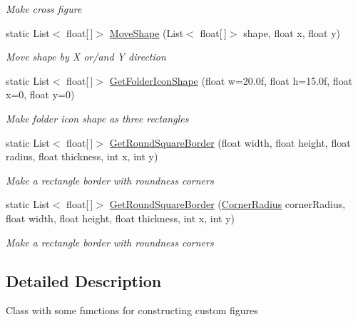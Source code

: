 \begin{DoxyCompactItemize}
\begin{DoxyCompactList}\small\item\em Make cross figure \end{DoxyCompactList}\item 
static List$<$ float\mbox{[}$\,$\mbox{]}$>$ \mbox{\hyperlink{class_space_v_i_l_1_1_graphics_math_service_a3eca6ab5259a561b3f73d8efe30c911e}{Move\+Shape}} (List$<$ float\mbox{[}$\,$\mbox{]}$>$ shape, float x, float y)
\begin{DoxyCompactList}\small\item\em Move shape by X or/and Y direction \end{DoxyCompactList}\item 
static List$<$ float\mbox{[}$\,$\mbox{]}$>$ \mbox{\hyperlink{class_space_v_i_l_1_1_graphics_math_service_a51f68778aa487f8ccad18df097255a4a}{Get\+Folder\+Icon\+Shape}} (float w=20.\+0f, float h=15.\+0f, float x=0, float y=0)
\begin{DoxyCompactList}\small\item\em Make folder icon shape as three rectangles \end{DoxyCompactList}\item 
static List$<$ float\mbox{[}$\,$\mbox{]}$>$ \mbox{\hyperlink{class_space_v_i_l_1_1_graphics_math_service_a2f8a4517c0dbab0a1efc68d9f9a75bfd}{Get\+Round\+Square\+Border}} (float width, float height, float radius, float thickness, int x, int y)
\begin{DoxyCompactList}\small\item\em Make a rectangle border with roundness corners \end{DoxyCompactList}\item 
static List$<$ float\mbox{[}$\,$\mbox{]}$>$ \mbox{\hyperlink{class_space_v_i_l_1_1_graphics_math_service_a7b07b7d30df9629b8d5a6379d9bf3996}{Get\+Round\+Square\+Border}} (\mbox{\hyperlink{class_space_v_i_l_1_1_decorations_1_1_corner_radius}{Corner\+Radius}} corner\+Radius, float width, float height, float thickness, int x, int y)
\begin{DoxyCompactList}\small\item\em Make a rectangle border with roundness corners \end{DoxyCompactList}\end{DoxyCompactItemize}


\subsection{Detailed Description}
Class with some functions for constructing custom figures 



